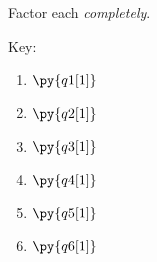 \documentclass[addpoints]{exam}
\begin{document}
\begin{questions}

\question[20] Factor each \emph{completely}.

\begin{multicols}{3}
\end{multicols}

\vspace{2in}

\begin{multicols}{3}
\end{multicols}

\newpage 

Key:

\begin{enumerate}
\item $\py{q1[1]}$
\item $\py{q2[1]}$
\item $\py{q3[1]}$
\item $\py{q4[1]}$
\item $\py{q5[1]}$
\item $\py{q6[1]}$
\end{enumerate}

\end{questions}
\end{document}
